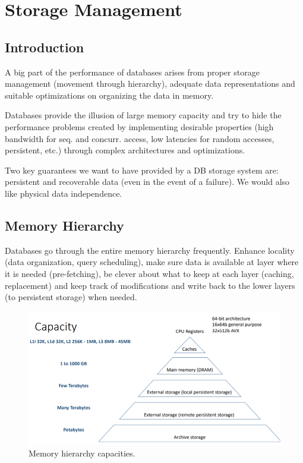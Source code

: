\section{Storage Management}

\subsection{Introduction}

A big part of the performance of databases arises from proper storage management (movement through hierarchy), adequate data representations and suitable optimizations on organizing the data in memory.

Databases provide the illusion of large memory capacity and try to hide the performance problems created by implementing desirable properties (high bandwidth for seq. and concurr. access, low latencies for random accesses, persistent, etc.) through complex architectures and optimizations.

Two key guarantees we want to have provided by a DB storage system are: persistent and recoverable data (even in the event of a failure). We would also like physical data independence.

\subsection{Memory Hierarchy}

Databases go through the entire memory hierarchy frequently. Enhance locality (data organization, query scheduling), make sure data is available at layer where it is needed (pre-fetching), be clever about what to keep at each layer (caching, replacement) and keep track of modifications and write back to the lower layers (to persistent storage) when needed.

\begin{figure}[h]
	\centering
	\includegraphics[scale=0.5]{images/1-cap.PNG}
	\caption{Memory hierarchy capacities.}
	\label{fig:cap}
\end{figure}

